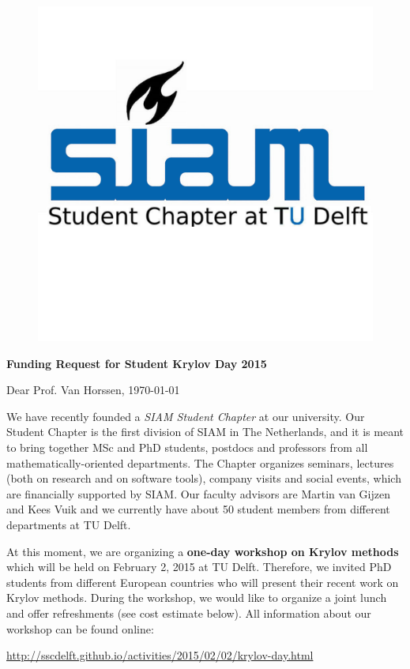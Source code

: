\documentclass[a4paper,10pt]{article}
\begin{document}
 

\clearpage
\thispagestyle{empty}

\begin{figure}
\hspace{10cm} \includegraphics[clip = true, viewport = 0cm 0cm 4.5cm 3.5cm, scale = 1]{SIAMSC_Delft} 
\end{figure}

\textbf{Funding Request for Student Krylov Day 2015}
\bigskip
\bigskip

Dear Prof. Van Horssen, \hfill \today

\bigskip
We have recently founded a \textit{SIAM Student Chapter} at our university. Our Student Chapter is the first division of SIAM in The Netherlands, and it is meant to bring together MSc and PhD students, postdocs and professors from all mathematically-oriented departments. The Chapter organizes seminars, lectures (both on research and on software tools), company visits and social events, which are financially supported by SIAM. Our faculty advisors are Martin van Gijzen and Kees Vuik and we currently have about 50 student members from different departments at TU Delft.

\bigskip
At this moment, we are organizing a \textbf{one-day workshop on Krylov methods} which will be held on February 2, 2015 at TU Delft. Therefore, we invited PhD students from different European countries who will present their recent work on Krylov methods. During the workshop, we would like to organize a joint lunch and offer refreshments (see cost estimate below). All information about our workshop can be found online:
\begin{center}
 \url{http://sscdelft.github.io/activities/2015/02/02/krylov-day.html}
\end{center}
\end{document}
